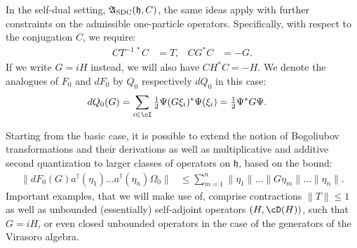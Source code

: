 \documentclass[a4paper, 11pt]{article}
\newcommand{\fA}{\mathfrak{A}}\newcommand{\cA}{\mathcal{A}}\newcommand{\dA}{\mathds{A}}\newcommand{\sA}{\mathscr{A}}
\newcommand{\fh}{\mathfrak{h}}
\DeclareMathOperator{\1}{\mathds{1}}
\DeclareMathOperator{\SDC}{\textup{SDC}}
\begin{document}
In the self-dual setting, $\fA_{\SDC}(\fh,C)$, the same ideas apply with further constraints on the admissible one-particle operators. Specifically, with respect to the conjugation $C$, we require:
\begin{align}
\label{eq:sdcconstraints}
CT^{-1\!\ *}C & = T, & CG^{*}C & = -G.
\end{align}
If we write $G = iH$ instead, we will also have $CH^{*}C=-H$. We denote the analogues of $F_{0}$ and $dF_{0}$ by $Q_{0}$ respectively $dQ_{0}$ in this case:
\begin{align}
\label{eq:secondquantarakisdc}
dQ_{0}(G) & = \sum_{i\in\cI}\tfrac{1}{2}\Psi(G\xi_{i})^{*}\Psi(\xi_{i}) = \tfrac{1}{2}\Psi^{*}G\Psi.
\end{align}

Starting from the basic case, it is possible to extend the notion of Bogoliubov transformations and their derivations as well as multiplicative and additive second quantization to larger classes of operators on $\fh$, based on the bound:
\begin{align}
\label{eq:secondquantboundvect}
\|dF_{0}(G)a^{\dag}(\eta_{1})\dots a^{\dag}(\eta_{n})\Omega_{0}\| & \leq \sum_{m=1}^{n}\|\eta_{1}\|\dots\|G\eta_{m}\|\dots\|\eta_{n}\|.
\end{align}
Important examples, that we will make use of, comprise contractions $\|T\|\leq1$ as well as unbounded (essentially) self-adjoint operators $(H,\cD(H))$, such that $G = iH$, or even closed unbounded operators in the case of the generators of the Virasoro algebra.
\end{document}
